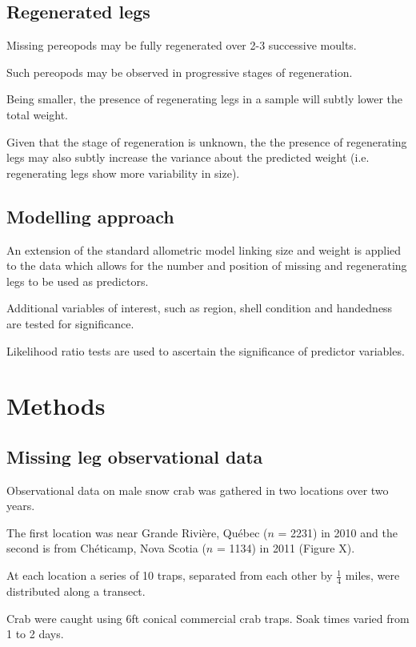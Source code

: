 \documentclass[letterpaper, 10pt]{article}
\begin{document}
\subsection{Regenerated legs}

Missing pereopods may be fully regenerated over 2-3 successive moults. 

Such pereopods may be observed in progressive stages of regeneration.

Being smaller, the presence of regenerating legs in a sample will subtly lower the total weight.

Given that the stage of regeneration is unknown, the the presence of regenerating legs may also subtly increase the variance about the predicted weight (i.e. regenerating legs show more variability in size).
 
\subsection{Modelling approach}

An extension of the standard allometric model linking size and weight is applied to the data which allows for the number and position of missing and regenerating legs to be used as predictors. 

Additional variables of interest, such as region, shell condition and handedness are tested for significance. 

Likelihood ratio tests are used to ascertain the significance of predictor variables. 

\section{Methods}

\subsection{Missing leg observational data}
Observational data on male snow crab was gathered in two locations over two years.

The first location was near Grande Rivière, Québec ($n$ = 2231) in 2010 and the second is from Chéticamp, Nova Scotia ($n$ = 1134) in 2011 (Figure X). 

At each location a series of 10 traps, separated from each other by $\frac{1}{4}$ miles, were distributed along a transect. 

Crab were caught using 6ft conical commercial crab traps. Soak times varied from 1 to 2 days.
\end{document}
